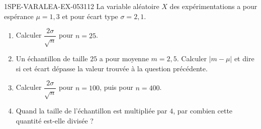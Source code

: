 \begin{exercice}{1SPE-VARALEA-EX-053}{1}{12}
La variable aléatoire $X$ des expérimentations a pour espérance
$\mu = 1{,}3$ et pour écart type $\sigma = 2{,}1$.

\begin{enumerate}
  \item Calculer $\dfrac{2\sigma}{\sqrt{n}}$ pour $n = 25$.
  \item Un échantillon de taille $25$ a pour moyenne $m = 2{,}5$.
        Calculer $|m - \mu|$ et dire si cet écart dépasse la valeur trouvée
        à la question précédente.
  \item Calculer $\dfrac{2\sigma}{\sqrt{n}}$ pour $n = 100$, puis pour
        $n = 400$.
  \item Quand la taille de l'échantillon est multipliée par $4$, par combien
        cette quantité est-elle divisée ?
\end{enumerate}
\end{exercice}

